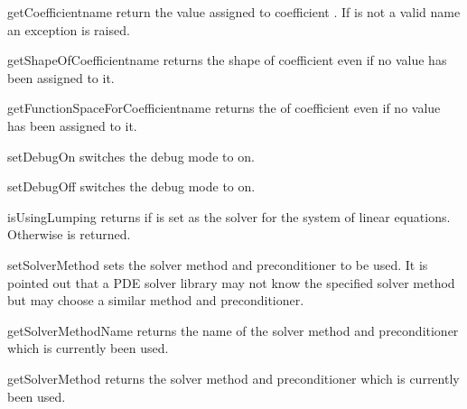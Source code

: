 \begin{methoddesc}[LinearPDE]{getCoefficient}{name}
return the value assigned to coefficient . If  is not a valid name
an exception is raised.
\end{methoddesc}

\begin{methoddesc}[LinearPDE]{getShapeOfCoefficient}{name}
returns the shape of coefficient  even if no value has been assigned to it.
\end{methoddesc}

\begin{methoddesc}[LinearPDE]{getFunctionSpaceForCoefficient}{name}
returns the \FunctionSpace of coefficient  even if no value has been assigned to it.
\end{methoddesc}

\begin{methoddesc}[LinearPDE]{setDebugOn}{}
switches the debug mode to on.
\end{methoddesc}

\begin{methoddesc}[LinearPDE]{setDebugOff}{}
switches the debug mode to on.
\end{methoddesc}

\begin{methoddesc}[LinearPDE]{isUsingLumping}{}
returns \True if \LUMPING is set as the solver for the system of linear equations.
Otherwise \False is returned.
\end{methoddesc}

\begin{methoddesc}[LinearPDE]{setSolverMethod}{}
sets the solver method and preconditioner to be used. It is pointed out that a PDE solver library
may not know the specified solver method but may choose a similar method and preconditioner.
\end{methoddesc}

\begin{methoddesc}[LinearPDE]{getSolverMethodName}{}
returns the name of the solver method and preconditioner which is currently been used.
\end{methoddesc}

\begin{methoddesc}[LinearPDE]{getSolverMethod}{}
returns the solver method and preconditioner which is currently been used.
\end{methoddesc}

